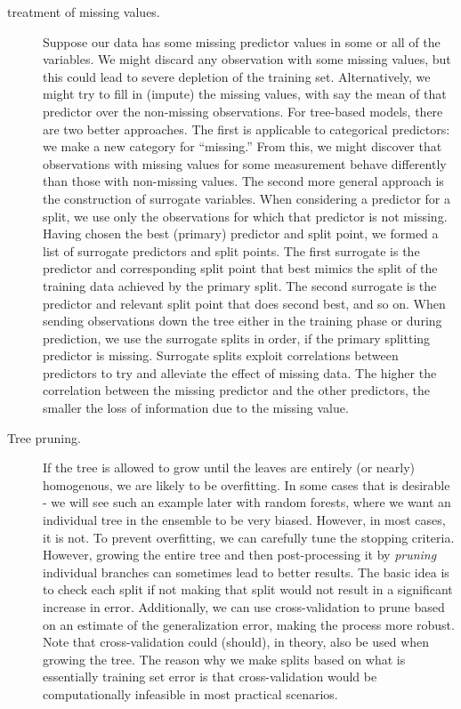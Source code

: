 \begin{description}
\item[treatment of missing values.] Suppose our data has some missing predictor values in some or all of the
variables. We might discard any observation with some missing values, but this could lead to severe depletion of the training set. Alternatively, we might try to fill in (impute) the missing values, with say the mean of that predictor over the non-missing observations. For tree-based models, there
are two better approaches. The first is applicable to categorical predictors: we make a new category for “missing.” From this, we might discover that observations with missing values for some measurement behave differently than those with non-missing values. The second more general approach is the construction of surrogate variables. When considering a predictor for a split, we use only the observations for which that predictor is not missing. Having chosen the best (primary) predictor and split point, we formed a list of surrogate predictors and split points. The first surrogate is the predictor and corresponding split point that best mimics the split of the training data achieved by the primary split. The second surrogate is the predictor and relevant split point that does second best, and so on. When sending observations down the tree either in the training phase or during prediction, we use the surrogate splits in order, if the primary splitting predictor is missing. Surrogate splits exploit correlations between predictors to try and alleviate the effect of missing data. The higher the correlation between the missing predictor and the other predictors, the smaller the loss of information due to the missing value.

\item[Tree pruning.] If the tree is allowed to grow until the leaves are entirely (or nearly) homogenous, we are likely to be overfitting. In some cases that is desirable - we will see such an example later with random forests, where we want an individual tree in the ensemble to be very biased. However, in most cases, it is not. To prevent overfitting, we can carefully tune the stopping criteria. However, growing the entire tree and then post-processing it by {\em pruning} individual branches can sometimes lead to better results. The basic idea is to check each split if not making that split would not result in a significant increase in error.
Additionally, we can use cross-validation to prune based on an estimate of the generalization error, making the process more robust. Note that cross-validation could (should), in theory, also be used when growing the tree. The reason why we make splits based on what is essentially training set error is that cross-validation would be computationally infeasible in most practical scenarios. 


\end{description}
